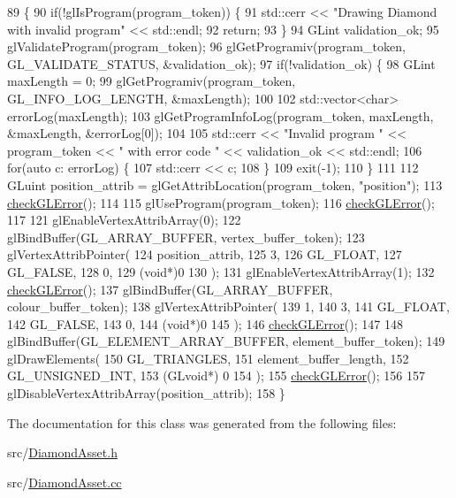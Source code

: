 \begin{DoxyCode}
89                                             \{
90   \textcolor{keywordflow}{if}(!glIsProgram(program\_token)) \{
91     std::cerr << \textcolor{stringliteral}{"Drawing Diamond with invalid program"} << std::endl;
92     \textcolor{keywordflow}{return};
93   \}
94   GLint validation\_ok;
95   glValidateProgram(program\_token);
96   glGetProgramiv(program\_token, GL\_VALIDATE\_STATUS, &validation\_ok);
97   \textcolor{keywordflow}{if}(!validation\_ok) \{
98     GLint maxLength = 0;
99     glGetProgramiv(program\_token, GL\_INFO\_LOG\_LENGTH, &maxLength);
100 
102     std::vector<char> errorLog(maxLength);
103     glGetProgramInfoLog(program\_token, maxLength, &maxLength, &errorLog[0]);
104 
105     std::cerr << \textcolor{stringliteral}{"Invalid program "} << program\_token << \textcolor{stringliteral}{" with error code "} << validation\_ok << std::endl;
106     \textcolor{keywordflow}{for}(\textcolor{keyword}{auto} c: errorLog) \{
107       std::cerr << c;
108     \}
109     exit(-1);
110   \}
111 
112   GLuint position\_attrib = glGetAttribLocation(program\_token, \textcolor{stringliteral}{"position"});
113   \hyperlink{DiamondAsset_8cc_a75f201b0e53e68726854997957322b8d}{checkGLError}();
114 
115   glUseProgram(program\_token);
116   \hyperlink{DiamondAsset_8cc_a75f201b0e53e68726854997957322b8d}{checkGLError}();
117 
121   glEnableVertexAttribArray(0);
122   glBindBuffer(GL\_ARRAY\_BUFFER, vertex\_buffer\_token);
123   glVertexAttribPointer(
124     position\_attrib,        
125     3,        
126     GL\_FLOAT,   
127     GL\_FALSE,   
128     0,        
129     (\textcolor{keywordtype}{void}*)0    
130   );
131   glEnableVertexAttribArray(1);
132   \hyperlink{DiamondAsset_8cc_a75f201b0e53e68726854997957322b8d}{checkGLError}();
137   glBindBuffer(GL\_ARRAY\_BUFFER, colour\_buffer\_token);
138   glVertexAttribPointer(
139     1,        
140     3,        
141     GL\_FLOAT,   
142     GL\_FALSE,   
143     0,        
144     (\textcolor{keywordtype}{void}*)0    
145   );
146   \hyperlink{DiamondAsset_8cc_a75f201b0e53e68726854997957322b8d}{checkGLError}();
147 
148   glBindBuffer(GL\_ELEMENT\_ARRAY\_BUFFER, element\_buffer\_token);
149   glDrawElements(
150     GL\_TRIANGLES,
151     element\_buffer\_length,
152     GL\_UNSIGNED\_INT,
153     (GLvoid*) 0
154   );
155   \hyperlink{DiamondAsset_8cc_a75f201b0e53e68726854997957322b8d}{checkGLError}();
156 
157   glDisableVertexAttribArray(position\_attrib);
158 \}
\end{DoxyCode}


The documentation for this class was generated from the following files\+:\begin{DoxyCompactItemize}
\item 
src/\hyperlink{DiamondAsset_8h}{Diamond\+Asset.\+h}\item 
src/\hyperlink{DiamondAsset_8cc}{Diamond\+Asset.\+cc}\end{DoxyCompactItemize}
